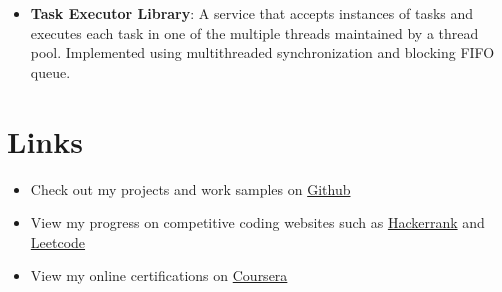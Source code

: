 \documentclass[letterpaper,11pt]{article}
\begin{document}
\begin{itemize}[noitemsep,nolistsep,leftmargin=*]
\item \textbf{Task Executor Library}: A service that accepts instances of tasks and executes each task in one of the multiple threads maintained by a thread pool. Implemented using multithreaded synchronization and blocking FIFO queue.
 \end{itemize}
     

 
\section{Links}
\begin{itemize}[noitemsep,nolistsep,leftmargin=*]


\item Check out my projects and work samples on \href{https://www.github.com/psprao95}{Github}
\item View my progress on competitive coding websites such as \href{https://www.hackerrank.com/psprao95}{Hackerrank} and \href{https://www.leetcode.com/psprao95}{Leetcode}
\item View my  online certifications on \href{https://www.coursera.org/user/b5584c6ff8b829314e6ea4476945ee82}{Coursera}
\end{itemize}
 

 
 
 
\end{document}
